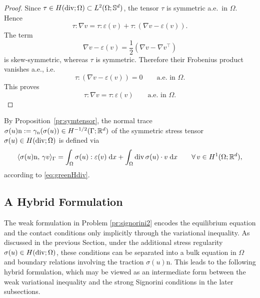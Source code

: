 \begin{proof}
	Since $\tau\in H(\diver;\Omega)\subset L^2(\Omega;\mathbb{S}^d)$, the tensor $\tau$ is symmetric a.e.\ in $\Omega$. Hence
	\begin{equation*}
		\tau:\nabla v
		=
		\tau:\varepsilon(v)
		+
		\tau:\left(\nabla v-\varepsilon(v)\right).
	\end{equation*}
	The term
	\begin{equation*}
		\nabla v-\varepsilon(v)=\frac12(\nabla v-\nabla v^\top)
	\end{equation*}
	is skew-symmetric, whereas $\tau$ is symmetric. Therefore their Frobenius product vanishes a.e., i.e.
	\begin{equation*}
		\tau:\left(\nabla v-\varepsilon(v)\right)=0
		\qquad \text{a.e.\ in }\Omega.
	\end{equation*}
	This proves
	\begin{equation*}
		\tau:\nabla v=\tau:\varepsilon(v)
		\qquad \text{a.e.\ in }\Omega.
	\end{equation*}
\end{proof}

By Proposition~\ref{pr:symtensor}, the normal trace $\sigma(u)\mathrm{n} := \gamma_\mathrm{n}(\sigma(u))\in H^{-1/2}(\Gamma;{\mathbb R}^d)$ of the symmetric stress tensor $\sigma(u)\in H(\diver;\Omega)$ is defined via
\begin{equation*}
	\langle\sigma(u)\mathrm{n},\,\gamma v\rangle_\Gamma = \int_\Omega\sigma(u):\varepsilon(v)\;\dx +\int_\Omega\diver\sigma(u)\cdot v\;\dx\qquad\forall\,v\in H^1(\Omega;\R^d),
\end{equation*}
according to \eqref{eq:greenHdiv}.

\subsection{A Hybrid Formulation}

The weak formulation in Problem \ref{pr:signorini2} encodes the equilibrium equation and the contact conditions only implicitly through the variational inequality. As discussed in the previous Section, under the additional stress regularity $\sigma(u)\in H(\diver;\Omega)$, these conditions can be separated into a bulk equation in $\Omega$ and boundary relations involving the traction $\sigma(u)\mathrm n$. This leads to the following hybrid formulation, which may be viewed as an intermediate form between the weak variational inequality and the strong Signorini conditions in the later subsections.

